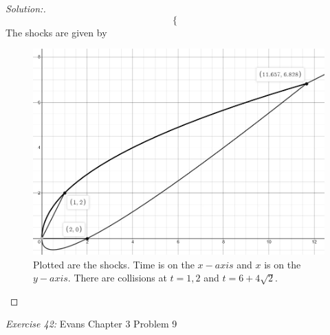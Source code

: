 \documentclass{article}
\newcommand{\exercise}[2]{
\vspace{0.2in}\begin{mdframed}[
  backgroundcolor=problem,
  skipabove=\topsep,
  skipbelow=\topsep
  ]
  \emph{Exercise {#1}:} {#2}
\end{mdframed}}
\begin{document}
\begin{proof}[Solution:]
\[\begin{cases}
      \end{cases}\]
      The shocks are given by 
      \begin{figure}[H]
        \centering
        \includegraphics[scale=0.5]{shocks.jpg}
        \caption{Plotted are the shocks. Time is on the $x-axis$ and $x$ is on the $y-axis$. There are collisions at $t=1,2$ and $t=6+4\sqrt{2}$.}
      \end{figure}
    \end{proof}
    \exercise{42}{Evans Chapter 3 Problem 9}
\end{document}
